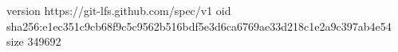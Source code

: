 version https://git-lfs.github.com/spec/v1
oid sha256:e1ec351c9cb68f9c5c9562b516bdf5e3d6ca6769ae33d218c1e2a9c397ab4e54
size 349692
